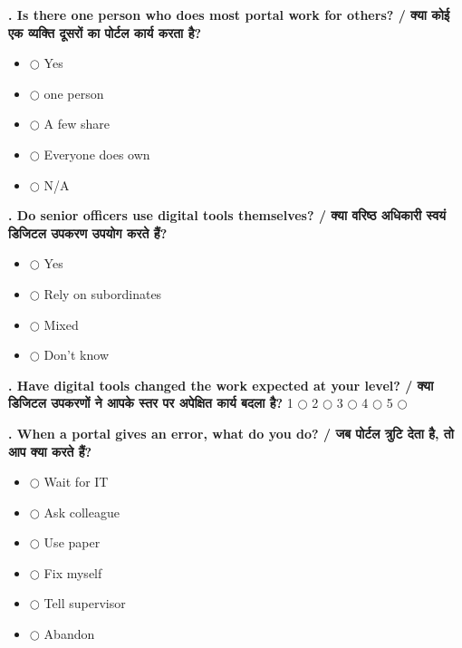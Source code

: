 \documentclass[11pt,a4paper]{article}
\newcounter{qcounter}
\begin{document}
\textbf{. Is there one person who does most portal work for others? / क्या कोई एक व्यक्ति दूसरों का पोर्टल कार्य करता है?}
\vspace{0.1cm}
\begin{itemize}[label=, itemsep=0.1cm, leftmargin=0.5cm]
    \item $\bigcirc$ Yes
    \item $\bigcirc$ one person
    \item $\bigcirc$ A few share
    \item $\bigcirc$ Everyone does own
    \item $\bigcirc$ N/A
\end{itemize}
\vspace{0.2cm}

\textbf{. Do senior officers use digital tools themselves? / क्या वरिष्ठ अधिकारी स्वयं डिजिटल उपकरण उपयोग करते हैं?}
\vspace{0.1cm}
\begin{itemize}[label=, itemsep=0.1cm, leftmargin=0.5cm]
    \item $\bigcirc$ Yes
    \item $\bigcirc$ Rely on subordinates
    \item $\bigcirc$ Mixed
    \item $\bigcirc$ Don't know
\end{itemize}
\vspace{0.2cm}

\textbf{. Have digital tools changed the work expected at your level? / क्या डिजिटल उपकरणों ने आपके स्तर पर अपेक्षित कार्य बदला है?}
\vspace{0.1cm}
\vspace{0.1cm}
1 $\bigcirc$ \hspace{1cm} 2 $\bigcirc$ \hspace{1cm} 3 $\bigcirc$ \hspace{1cm} 4 $\bigcirc$ \hspace{1cm} 5 $\bigcirc$
\vspace{0.4cm}

\textbf{. When a portal gives an error, what do you do? / जब पोर्टल त्रुटि देता है, तो आप क्या करते हैं?}
\vspace{0.1cm}
\begin{itemize}[label=, itemsep=0.1cm, leftmargin=0.5cm]
    \item $\bigcirc$ Wait for IT
    \item $\bigcirc$ Ask colleague
    \item $\bigcirc$ Use paper
    \item $\bigcirc$ Fix myself
    \item $\bigcirc$ Tell supervisor
    \item $\bigcirc$ Abandon
\end{itemize}
\vspace{0.2cm}
\end{document}
